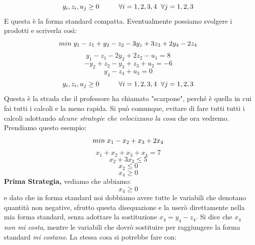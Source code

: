 \begin{equation*}
    y_i, z_i, u_j \geq 0 \hspace{1cm} \forall i = 1,2,3,4 \hspace{0.2cm} \forall j = 1,2,3
\end{equation*}
E questa è la forma standard compatta. Eventualmente possiamo svolgere i prodotti e scriverla così:
\begin{equation*}
    min \hspace{0.1cm} y_1 - z_1 + y_2 - z_2 -3y_z + 3z_3 + 2y_4 - 2z_4  
\end{equation*}
\begin{equation*}
    y_1 - z_1 - 2y_2 + 2z_2 - u_1 = 8
\end{equation*}
\begin{equation*}
    - y_2 + z_2 -y_3 + z_3 + u_2 = -6
\end{equation*}
\begin{equation*}
    y_4 - z_4 + u_3 = 0
\end{equation*}
\begin{equation*}
    y_i, z_i, u_j \geq 0 \hspace{1cm} \forall i = 1,2,3,4 \hspace{0.2cm} \forall j = 1,2,3
\end{equation*}
Questa è la strada che il professore ha chiamato "scarpone", perché è quella in cui fai tutti i calcoli e la meno rapida. Si può comunque, evitare di fare tutti tutti i calcoli adottando \textit{alcune strategie che velocizzano la cosa} che ora vedremo. Prendiamo questo esempio:
\begin{equation*}
    min \hspace{0.1cm} x_1 - x_2 + x_3 + 2x_4
\end{equation*}
\begin{equation*}
    x_1 + x_2 + x_3 + x_4 = 7
\end{equation*}
\begin{equation*}
    x_2 + 3x_3 \leq 5
\end{equation*}
\begin{equation*}
    x_2 \leq 0
\end{equation*}
\begin{equation*}
    x_4 \geq 0
\end{equation*}
\textbf{Prima Strategia,} vediamo che abbiamo:
\begin{equation*}
    x_4 \geq 0
\end{equation*}
e dato che in forma standard noi dobbiamo avere tutte le variabili che denotano quantità non negative, sfrutto questa disequazione e la userò direttamente nella mia forma standard, senza adottare la sostituzione $x_4 = y_4 - z_4$. Si dice che $x_4$ \textit{non mi costa}, mentre le variabili che dovrò sostituire per raggiungere la forma standard \textit{mi costano}. La stessa cosa si potrebbe fare con:

